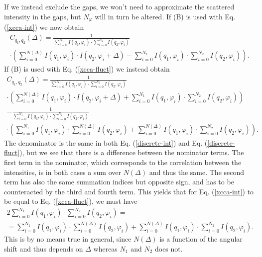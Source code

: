 \documentclass[12pt]{article}
\begin{document}
\newpage
If we instead exclude the gaps, we won't need to approximate the scattered intensity in the gaps, but $N_{\varphi}$ will in turn be altered. If (B) is used with Eq. (\ref{xcca-int}) we now obtain
\begin{align}\label{discrete-int}
C_{q_1,q_2}(\Delta) = \frac{1}{\sum_{i=0}^{N_1} I(q_1,\varphi_i)\cdot\sum_{i=0}^{N_2} I(q_2,\varphi_i)} \\
\cdot\left(\sum_{i=0}^{N(\Delta)} I(q_1,\varphi_i)\cdot I(q_2,\varphi_i+\Delta)-\sum_{i=0}^{N_1} I(q_1,\varphi_i)\cdot\sum_{i=0}^{N_2} I(q_2,\varphi_i)\right).\nonumber
\end{align}
If (B) is used with Eq. (\ref{xcca-fluct}) we instead obtain
\begin{align}\label{discrete-fluct}
C_{q_1,q_2}(\Delta) = \frac{1}{\sum_{i=0}^{N_1} I(q_1,\varphi_i)\cdot\sum_{i=0}^{N_2} I(q_2,\varphi_i)} \\
\cdot\left(\sum_{i=0}^{N(\Delta)} I(q_1,\varphi_i)\cdot I(q_2,\varphi_i+\Delta)+\sum_{i=0}^{N_1} I(q_1,\varphi_i)\cdot\sum_{i=0}^{N_2} I(q_2,\varphi_i)\right) \nonumber \\
-\frac{1}{\sum_{i=0}^{N_1} I(q_1,\varphi_i)\cdot\sum_{i=0}^{N_2} I(q_2,\varphi_i)} \nonumber \\
\cdot\left(\sum_{i=0}^{N_1} I(q_1,\varphi_i)\cdot\sum_{i=0}^{N(\Delta)} I(q_2,\varphi_i)+\sum_{i=0}^{N(\Delta)} I(q_1,\varphi_i)\cdot\sum_{i=0}^{N_2} I(q_2,\varphi_i)\right).\nonumber
\end{align}
The denominator is the same in both Eq. (\ref{discrete-int}) and Eq. (\ref{discrete-fluct}), but we see that there is a difference between the nominator terms. The first term in the nominator, which corresponds to the correlation between the intensities, is in both cases a sum over $N(\Delta)$ and thus the same. The second term has also the same summation indices but opposite sign, and has to be counteracted by the third and fourth term. This yields that for Eq. (\ref{xcca-int}) to be equal to Eq. (\ref{xcca-fluct}), we must have
\begin{align}\label{discrete-int=fluct}
2\sum_{i=0}^{N_1} I(q_1,\varphi_i)\cdot\sum_{i=0}^{N_2} I(q_2,\varphi_i) = \\
= \sum_{i=0}^{N_1} I(q_1,\varphi_i)\cdot\sum_{i=0}^{N(\Delta)} I(q_2,\varphi_i)+\sum_{i=0}^{N(\Delta)} I(q_1,\varphi_i)\cdot\sum_{i=0}^{N_2} I(q_2,\varphi_i). \nonumber
\end{align}
This is by no means true in general, since $N(\Delta)$ is a function of the angular shift and thus depends on $\Delta$ whereas $N_1$ and $N_2$ does not.
\end{document}
